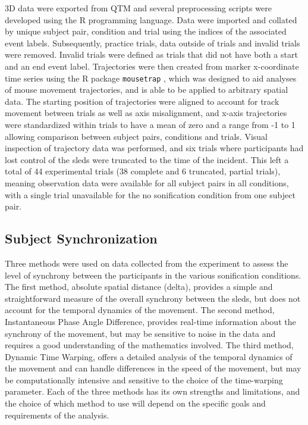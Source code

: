 \documentclass[10pt,a4paper,onecolumn]{article}
\begin{document}
3D data were exported from QTM and several preprocessing scripts were developed using the R programming language. Data were imported and collated by unique subject pair, condition and trial using the indices of the associated event labels. Subsequently, practice trials, data outside of trials and invalid trials were removed. Invalid trials were defined as trials that did not have both a start and an end event label. Trajectories were then created from marker x-coordinate time series using the R package \texttt{mousetrap} \autocite{mousetrap2021}, which was designed to aid analyses of mouse movement trajectories, and is able to be applied to arbitrary spatial data. The starting position of trajectories were aligned to account for track movement between trials as well as axis misalignment, and x-axis trajectories were standardized within trials to have a mean of zero and a range from -1 to 1 allowing comparison between subject pairs, conditions and trials. Visual inspection of trajectory data was performed, and six trials where participants had lost control of the sleds were truncated to the time of the incident. This left a total of 44 experimental trials (38 complete and 6 truncated, partial trials), meaning observation data were available for all subject pairs in all conditions, with a single trial unavailable for the no sonification condition from one subject pair.

\hypertarget{subject-synchronization}{%
\subsection{Subject Synchronization}\label{subject-synchronization}}

Three methods were used on data collected from the experiment to assess the level of synchrony between the participants in the various sonification conditions. The first method, absolute spatial distance (delta), provides a simple and straightforward measure of the overall synchrony between the sleds, but does not account for the temporal dynamics of the movement. The second method, Instantaneous Phase Angle Difference, provides real-time information about the synchrony of the movement, but may be sensitive to noise in the data and requires a good understanding of the mathematics involved. The third method, Dynamic Time Warping, offers a detailed analysis of the temporal dynamics of the movement and can handle differences in the speed of the movement, but may be computationally intensive and sensitive to the choice of the time-warping parameter. Each of the three methods has its own strengths and limitations, and the choice of which method to use will depend on the specific goals and requirements of the analysis.
\end{document}
